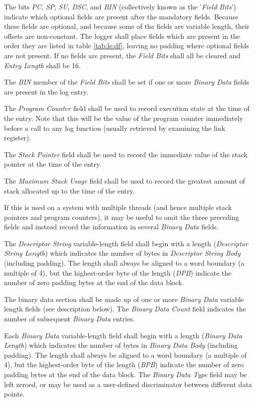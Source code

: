 \documentclass[paper=letter, fontsize=10pt]{scrartcl} %
\numberwithin{equation}{section} %
\numberwithin{figure}{section} %
\numberwithin{table}{section} %
\begin{document}
The bits \emph{PC}, \emph{SP}, \emph{SU}, \emph{DSC}, and \emph{BIN}
(collectively known as the '\emph{Field Bits}') indicate which optional fields
are present after the mandatory fields. Because these fields are optional, and
because some of the fields are variable length, their offsets are non-constant.
The logger shall place fields which are present  in the order they are listed in
table \ref{tab:le:df}, leaving no padding where optional fields are not present.
If no fields are present, the \emph{Field Bits} shall all be cleared and
\emph{Entry Length} shall be 16.

The \emph{BIN} member of the \emph{Field Bits} shall be set if one or more
\emph{Binary Data} fields are present in the log entry.

The \emph{Program Counter} field shall be used to record execution state at the
time of the entry. Note that this will be the value of the program counter
immediately before a call to any log function (usually retrieved by examining
the link register).

The \emph{Stack Pointer} field shall be used to record the immediate value of
the stack pointer at the time of the entry.

The \emph{Maximum Stack Usage} field shall be used to record the greatest amount
of stack allocated up to the time of the entry.

If this is used on a system with multiple threads (and hence multiple stack
pointers and program counters), it may be useful to omit the three preceding
fields and instead record the information in several \emph{Binary Data} fields.

The \emph{Descriptor String} variable-length field shall begin with a length
(\emph{Descriptor String Length}) which indicates the number of bytes in
\emph{Descriptor String Body} (including padding). The length shall always be
aligned to a word boundary (a multiple of 4), but the highest-order byte of the
length (\emph{DPB}) indicate the number of zero padding bytes at the end of the
data block.

The binary data section shall be made up of one or more \emph{Binary Data}
variable length fields (see description below). The \emph{Binary Data Count}
field indicates the number of subsequent \emph{Binary Data} entries.

Each \emph{Binary Data} variable-length field shall begin with a length
(\emph{Binary Data Length}) which indicates the number of bytes in \emph{Binary
Data Body} (including padding). The length shall always be aligned to a word
boundary (a multiple of 4), but the highest-order byte of the length
(\emph{BPB}) indicate the number of zero padding bytes at the end of the data
block. The \emph{Binary Data Type} field may be left zeroed, or may be used as a
user-defined discriminator between different data points.
\end{document}
